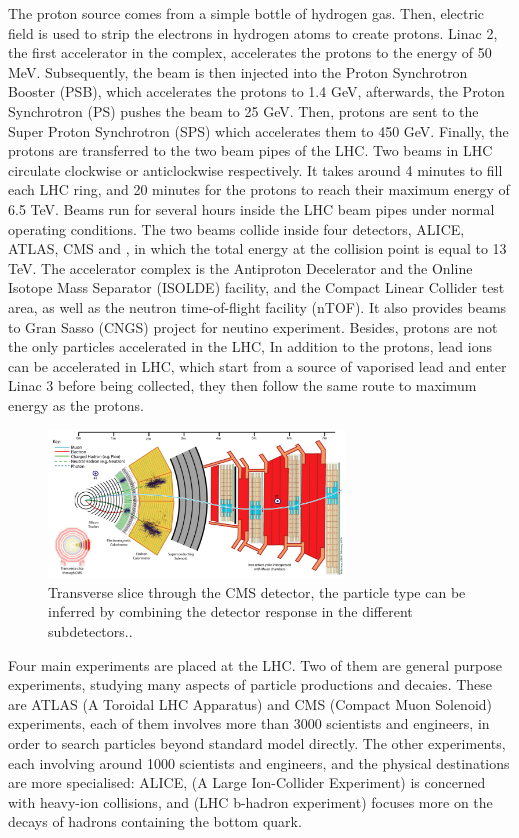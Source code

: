 The proton source comes from a simple bottle of hydrogen gas. 
Then, 
electric field is used to strip the electrons in hydrogen atoms to create protons. 
Linac 2, 
the first accelerator in the complex, 
accelerates the protons to the energy of 50 MeV. 
Subsequently,
the beam is then injected into the Proton Synchrotron Booster (PSB), 
which accelerates the protons to 1.4 GeV, 
afterwards, the Proton Synchrotron (PS) pushes the beam to 25 GeV. 
Then, 
protons are sent to the Super Proton Synchrotron (SPS) which accelerates them to 450 GeV.
Finally, 
the protons are transferred to the two beam pipes of the LHC. 
Two beams in LHC circulate clockwise or anticlockwise respectively.
It takes around 4 minutes to fill each LHC ring, 
and 20 minutes for the protons to reach their maximum energy of 6.5 TeV. 
Beams run for several hours inside the LHC beam pipes under normal operating conditions. 
The two beams collide inside four detectors, 
ALICE, ATLAS, CMS and \lhcb, 
in which the total energy at the collision point is equal to 13 TeV.
The accelerator complex is the Antiproton Decelerator and the Online Isotope Mass Separator (ISOLDE) facility, 
and the Compact Linear Collider test area, 
as well as the neutron time-of-flight facility (nTOF). 
It also provides beams to Gran Sasso (CNGS) project for neutino experiment.
Besides,
protons are not the only particles accelerated in the LHC,
In addition to the protons,
lead ions can be accelerated in LHC,
which start from a source of vaporised lead and enter Linac 3 before being collected, 
they then follow the same route to maximum energy as the protons.

\begin{figure}[!hbtp]
\centering
\includegraphics[width=0.7\textwidth]{Figures/02_Detector/CMS}%
\caption{Transverse slice through the CMS detector,
the particle type can be inferred by combining the detector response in the different subdetectors.\supercite{Nielsen_2011}.}
\label{fig:CMS}
\end{figure}

Four main experiments are placed at the LHC. 
Two of them are general purpose experiments, 
studying many aspects of particle productions and decaies. 
These are ATLAS (A Toroidal LHC Apparatus) and CMS (Compact Muon Solenoid) experiments, 
each of them involves more than 3000 scientists and engineers,
in order to search particles beyond standard model directly.
The other experiments, 
each involving around 1000 scientists and engineers, 
and the physical destinations are more specialised: ALICE, (A Large Ion-Collider Experiment) is concerned with heavy-ion collisions, 
and \lhcb (LHC b-hadron experiment) focuses more on the decays of hadrons containing the bottom quark.

